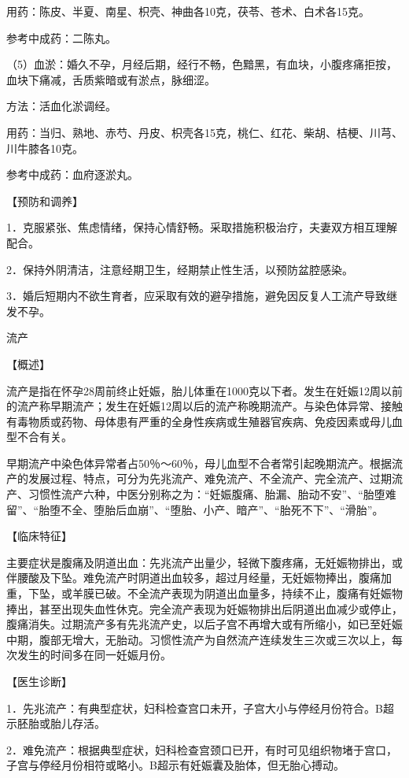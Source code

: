 \documentclass[12pt,UTF8,openany]{ctexbook}
\begin{document}
用药：陈皮、半夏、南星、枳壳、神曲各10克，茯苓、苍术、白术各15克。

参考中成药：二陈丸。

（5）血淤：婚久不孕，月经后期，经行不畅，色黯黑，有血块，小腹疼痛拒按，血块下痛减，舌质紫暗或有淤点，脉细涩。

方法：活血化淤调经。

用药：当归、熟地、赤芍、丹皮、枳壳各15克，桃仁、红花、柴胡、桔梗、川芎、川牛膝各10克。

参考中成药：血府逐淤丸。

【预防和调养】

1．克服紧张、焦虑情绪，保持心情舒畅。采取措施积极治疗，夫妻双方相互理解配合。

2．保持外阴清洁，注意经期卫生，经期禁止性生活，以预防盆腔感染。

3．婚后短期内不欲生育者，应采取有效的避孕措施，避免因反复人工流产导致继发不孕。





流产


【概述】

流产是指在怀孕28周前终止妊娠，胎儿体重在1000克以下者。发生在妊娠12周以前的流产称早期流产；发生在妊娠12周以后的流产称晚期流产。与染色体异常、接触有毒物质或药物、母体患有严重的全身性疾病或生殖器官疾病、免疫因素或母儿血型不合有关。

早期流产中染色体异常者占50％～60％，母儿血型不合者常引起晚期流产。根据流产的发展过程、特点，可分为先兆流产、难免流产、不全流产、完全流产、过期流产、习惯性流产六种，中医分别称之为：“妊娠腹痛、胎漏、胎动不安”、“胎堕难留”、“胎堕不全、堕胎后血崩”、“堕胎、小产、暗产”、“胎死不下”、“滑胎”。

【临床特征】

主要症状是腹痛及阴道出血：先兆流产出量少，轻微下腹疼痛，无妊娠物排出，或伴腰酸及下坠。难免流产时阴道出血较多，超过月经量，无妊娠物捧出，腹痛加重，下坠，或羊膜已破。不全流产表现为阴道出血量多，持续不止，腹痛有妊娠物捧出，甚至出现失血性休克。完全流产表现为妊娠物排出后阴道出血减少或停止，腹痛消失。过期流产多有先兆流产史，以后子宫不再增大或有所缩小，如已至妊娠中期，腹部无增大，无胎动。习惯性流产为自然流产连续发生三次或三次以上，每次发生的时间多在同一妊娠月份。

【医生诊断】

1．先兆流产：有典型症状，妇科检查宫口未开，子宫大小与停经月份符合。B超示胚胎或胎儿存活。

2．难免流产：根据典型症状，妇科检查宫颈口已开，有时可见组织物堵于宫口，子宫与停经月份相符或略小。B超示有妊娠囊及胎体，但无胎心搏动。
\end{document}
